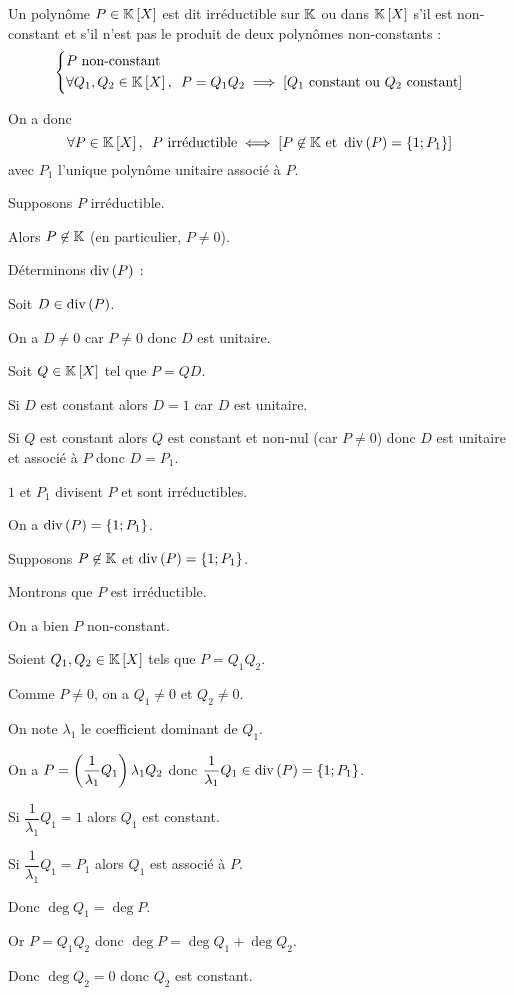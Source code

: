 \begin{defi}
Un polynôme \(P\in\poly\) est dit irréductible sur \(\mathbb{K}\) ou dans \(\poly\) s'il est non-constant et s'il n'est pas le produit de deux polynômes non-constants : \[\begin{dcases}P\text{ non-constant} \\ \quantifs{\forall Q_1,Q_2\in\poly}P=Q_1Q_2\imp\croch{Q_1\text{ constant ou }Q_2\text{ constant}}\end{dcases}\]

On a donc \[\quantifs{\forall P\in\poly}P\text{ irréductible}\ssi\croch{P\not\in\K\text{ et }\ensdiv{P}=\accol{1;P_1}}\] avec \(P_1\) l'unique polynôme unitaire associé à \(P\).
\end{defi}

\begin{dem}
\impdir

Supposons \(P\) irréductible.

Alors \(P\not\in\mathbb{K}\) (en particulier, \(P\not=0\)).

Déterminons \(\operatorname{div}\left(P\right)\) :

\analyse

Soit \(D\in\operatorname{div}\left(P\right)\).

On a \(D\not=0\) car \(P\not=0\) donc \(D\) est unitaire.

Soit \(Q\in\poly\) tel que \(P=QD\).

Si \(D\) est constant alors \(D=1\) car \(D\) est unitaire.

Si \(Q\) est constant alors \(Q\) est constant et non-nul (car \(P\not=0\)) donc \(D\) est unitaire et associé à \(P\) donc \(D=P_1\).

\synthese \(1\) et \(P_1\) divisent \(P\) et sont irréductibles.

\conclusion On a \(\operatorname{div}\left(P\right)=\left\lbrace1;P_1\right\rbrace\).

\imprec

Supposons \(P\not\in\mathbb{K}\) et \(\operatorname{div}\left(P\right)=\left\lbrace1;P_1\right\rbrace\).

Montrons que \(P\) est irréductible.

On a bien \(P\) non-constant.

Soient \(Q_1,Q_2\in\poly\) tels que \(P=Q_1Q_2\).

Comme \(P\not=0\), on a \(Q_1\not=0\) et \(Q_2\not=0\).

On note \(\lambda_1\) le coefficient dominant de \(Q_1\).

On a \(P=\left(\dfrac{1}{\lambda_1}Q_1\right)\lambda_1Q_2\) donc \(\dfrac{1}{\lambda_1}Q_1\in\operatorname{div}\left(P\right)=\left\lbrace1;P_1\right\rbrace\).

Si \(\dfrac{1}{\lambda_1}Q_1=1\) alors \(Q_1\) est constant.

Si \(\dfrac{1}{\lambda_1}Q_1=P_1\) alors \(Q_1\) est associé à \(P\).

Donc \(\deg Q_1=\deg P\).

Or \(P=Q_1Q_2\) donc \(\deg P=\deg Q_1+\deg Q_2\).

Donc \(\deg Q_2=0\) donc \(Q_2\) est constant.
\end{dem}

